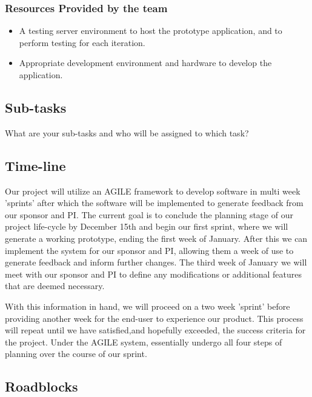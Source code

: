 \documentclass[10pt,twocolumn,letterpaper]{article}
\begin{document}
                \subsubsection{Resources Provided by the team}
                \begin{itemize}
                  \item A testing server environment to host the prototype application, and to perform testing for each iteration.
                  \item Appropriate development environment and hardware to develop the application.
                \end{itemize}
            \subsection{Sub-tasks}

            What are your sub-tasks and who will be assigned to which task?

            \subsection{Time-line}

            Our project will utilize an AGILE framework to develop software in multi week 'sprints' after which the software will be implemented to generate feedback from our sponsor and PI. The current goal is to conclude the planning stage of our project life-cycle by December 15th and begin our first sprint, where we will generate a working prototype, ending the first week of January. After this we can implement the system for our sponsor and PI, allowing them a week of use to generate feedback and inform further changes. The third week of January we will meet with our sponsor and PI to define any modifications or additional features that are deemed necessary. 
            
            With this information in hand, we will proceed on a two week 'sprint' before providing another week for the end-user to experience our product. This process will repeat until we have satisfied,and hopefully exceeded, the success criteria for the project. Under the AGILE system, essentially undergo all four steps of planning over the course of our sprint.

            \subsection{Roadblocks}
\end{document}
